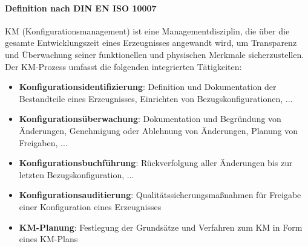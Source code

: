 \paragraph{Definition nach DIN EN ISO 10007}
KM (Konfigurationsmanagement) ist eine Managementdisziplin, die über die gesamte Entwicklungszeit eines Erzeugnisses angewandt wird, um Transparenz und Überwachung seiner funktionellen und physischen Merkmale sicherzustellen.
\\
Der KM-Prozess umfasst die folgenden integrierten Tätigkeiten:
\begin{itemize}
	\item \textbf{Konfigurationsidentifizierung}: Definition und Dokumentation der Bestandteile eines Erzeugnisses, Einrichten von Bezugskonfigurationen, ...
	\item \textbf{Konfigurationsüberwachung}: Dokumentation und Begründung von Änderungen, Genehmigung oder Ablehnung von Änderungen, Planung von Freigaben, ...
	\item \textbf{Konfigurationsbuchführung}: Rückverfolgung aller Änderungen bis zur letzten Bezugskonfiguration, ...
	\item \textbf{Konfigurationsauditierung}: Qualitätssicherungsmaßnahmen für Freigabe einer Konfiguration eines Erzeugnisses
	\item \textbf{KM-Planung}: Festlegung der Grundsätze und Verfahren zum KM in Form eines KM-Plans
\end{itemize}
